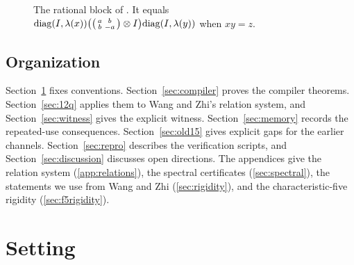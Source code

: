 \documentclass[11pt]{article}
\begin{document}
\begin{figure}[t]
\centering
{}
\caption{The rational block of \cite{MghirbiDouglasV1}.  It equals $\mathrm{diag}(I,\lambda(x))\bigl(\begin{psmallmatrix}a&b\\b&-a\end{psmallmatrix}\otimes I\bigr)\mathrm{diag}(I,\lambda(y))$ when $xy=z$.}
\label{fig:block}
\end{figure}

\subsection{Organization}
Section~\ref{sec:setup} fixes conventions.  Section~\ref{sec:compiler} proves the compiler theorems.  Section~\ref{sec:12q} applies them to Wang and Zhi's relation system, and Section~\ref{sec:witness} gives the explicit witness.  Section~\ref{sec:memory} records the repeated-use consequences.  Section~\ref{sec:old15} gives explicit gaps for the earlier channels.  Section~\ref{sec:repro} describes the verification scripts, and Section~\ref{sec:discussion} discusses open directions.  The appendices give the relation system (\ref{app:relations}), the spectral certificates (\ref{sec:spectral}), the statements we use from Wang and Zhi (\ref{sec:rigidity}), and the characteristic-five rigidity (\ref{sec:f5rigidity}).

\section{Setting}\label{sec:setup}
\end{document}
